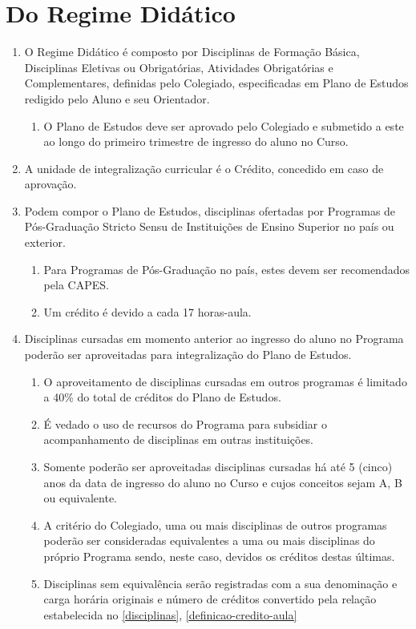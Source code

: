 \documentclass{article}
\newcommand{\singleitem}{\item[Parágrafo Único.]}
\newcommand{\grupoMenor}{Colegiado\xspace}
\begin{document}
\section{Do Regime Didático}
\begin{enumerate}
	\item O Regime Didático é composto por Disciplinas de Formação Básica, Disciplinas Eletivas ou Obrigatórias, Atividades Obrigatórias e Complementares, definidas pelo \grupoMenor, especificadas em Plano de Estudos redigido pelo Aluno e seu Orientador.
	\begin{enumerate}
		\singleitem O Plano de Estudos deve ser aprovado pelo \grupoMenor e submetido a este ao longo do primeiro trimestre de ingresso do aluno no Curso.
	\end{enumerate}

	\item A unidade de integralização curricular é o Crédito, concedido em caso de aprovação.

	\item \label{disciplinas} Podem compor o Plano de Estudos, disciplinas ofertadas por Programas de Pós-Graduação Stricto Sensu de Instituições de Ensino Superior no país ou exterior.
	\begin{enumerate}
		\item Para Programas de Pós-Graduação no país, estes devem ser recomendados pela CAPES.
		\item \label{definicao-credito-aula} Um crédito é devido a cada 17 horas-aula.
	\end{enumerate}

	\item Disciplinas cursadas em momento anterior ao ingresso do aluno no Programa poderão ser aproveitadas para integralização do Plano de Estudos.
	\begin{enumerate}
		\item O aproveitamento de disciplinas cursadas em outros programas é limitado a 40\% do total de créditos do Plano de Estudos.
		\item É vedado o uso de recursos do Programa para subsidiar o acompanhamento de disciplinas em outras instituições.
		\item Somente poderão ser aproveitadas disciplinas cursadas há até 5 (cinco) anos da data de ingresso do aluno no Curso e cujos conceitos sejam A, B ou equivalente.
		\item A critério do \grupoMenor, uma ou mais disciplinas de outros programas poderão ser consideradas equivalentes a uma ou mais disciplinas do próprio Programa sendo, neste caso, devidos os créditos destas últimas.
		\item Disciplinas sem equivalência serão registradas com a sua denominação e carga horária originais e número de créditos convertido pela relação estabelecida no \ref{disciplinas}, \ref{definicao-credito-aula}
	\end{enumerate}


\end{enumerate}
\end{document}
